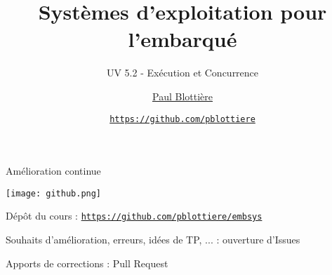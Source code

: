 \title{Systèmes d'exploitation pour l'embarqué}
\subtitle{UV 5.2 - Exécution et Concurrence}

\author{\href{}{Paul Blottière}}
\date{
    \href{https://github.com/pblottiere}{\tt \scriptsize https://github.com/pblottiere} \\[2pt]
}



{
\frame{
    \titlepage
} }

\begin{frame}{Amélioration continue}
    \vspace{12pt}

    \begin{center}
    \texttt{[image: github.png]}
    \end{center}

    \bi
    \itemsep12pt
    \item Dépôt du cours : \href{https://github.com/pblottiere/embsys}{\tt \scriptsize https://github.com/pblottiere/embsys}
    \item Souhaits d'amélioration, erreurs, idées de TP, ... : ouverture d'Issues
    \item Apports de corrections : Pull Request
    \ei
\end{frame}


